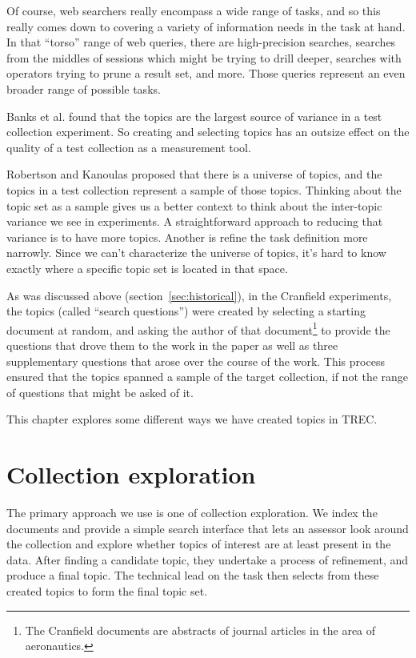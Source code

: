 \documentclass[nobib]{tufte-book}
\begin{document}
Of course, web searchers really encompass a wide range of tasks, and so this really comes down to covering a variety of information needs in the task at hand.  In that ``torso'' range of web queries, there are high-precision searches, searches from the middles of sessions which might be trying to drill deeper, searches with operators trying to prune a result set, and more.  Those queries represent an even broader range of possible tasks.

Banks et al. found that the topics are the largest source of variance in a test collection experiment.\autocite{banks-over}  So creating and selecting topics has an outsize effect on the quality of a test collection as a measurement tool.

Robertson and Kanoulas proposed that there is a universe of topics, and the topics in a test collection represent a sample of those topics.\autocite{robertson_topic_variance} Thinking about the topic set as a sample gives us a better context to think about the inter-topic variance we see in experiments.  A straightforward approach to reducing that variance is to have more topics.  Another is refine the task definition more narrowly.  Since we can't characterize the universe of topics, it's hard to know exactly where a specific topic set is located in that space.

As was discussed above (section~\ref{sec:historical}), in the Cranfield experiments, the topics (called ``search questions'') were created by selecting a starting document at random, and asking the author of that document\footnote{The Cranfield documents are abstracts of journal articles in the area of aeronautics.} to provide the questions that drove them to the work in the paper as well as three supplementary questions that arose over the course of the work.  This process ensured that the topics spanned a sample of the target collection, if not the range of questions that might be asked of it.

This chapter explores some different ways we have created topics in TREC.

\section{Collection exploration}

The primary approach we use is one of collection exploration. We index the documents and provide a simple search interface that lets an assessor look around the collection and explore whether topics of interest are at least present in the data.  After finding a candidate topic, they undertake a process of refinement, and produce a final topic.  The technical lead on the task then selects from these created topics to form the final topic set.
\end{document}
